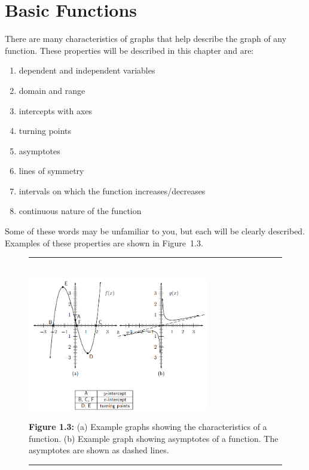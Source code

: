             \section{ Basic Functions}
            \nopagebreak
      \label{m39337*id235621}There are many characteristics of graphs that help describe the graph of any function. These properties will be described in this chapter and are:\par 
      \label{m39337*id235628}\begin{enumerate}[noitemsep, label=\textbf{\arabic*}. ] 
            \label{m39337*uid31}\item dependent and independent variables
\label{m39337*uid32}\item domain and range
\label{m39337*uid33}\item intercepts with axes
\label{m39337*uid34}\item turning points
\label{m39337*uid35}\item asymptotes
\label{m39337*uid36}\item lines of symmetry
\label{m39337*uid37}\item intervals on which the function increases/decreases
\label{m39337*uid38}\item continuous nature of the function
\end{enumerate}
      \label{m39337*id235730}Some of these words may be unfamiliar to you, but each will be clearly described. Examples of these properties are shown in Figure~1.3.\par 
    \setcounter{subfigure}{0}
	\begin{figure}[H] %
    \begin{center}
    \rule[.1in]{\figurerulewidth}{.005in} \\
        \label{m39337*uid39!!!underscore!!!media}\label{m39337*uid39!!!underscore!!!printimage}\includegraphics[width=300px]{col11306.imgs/m39337_MG10C11_034.png} %
      \vspace{2pt}
    \vspace{\rubberspace}\par \begin{cnxcaption}
	  \small \textbf{Figure 1.3: }(a) Example graphs showing the characteristics of a function. (b) Example graph showing asymptotes of a function. The asymptotes are shown as dashed lines.
	\end{cnxcaption}
    \vspace{.1in}
    \rule[.1in]{\figurerulewidth}{.005in} \\
    \end{center}
 \end{figure}       
